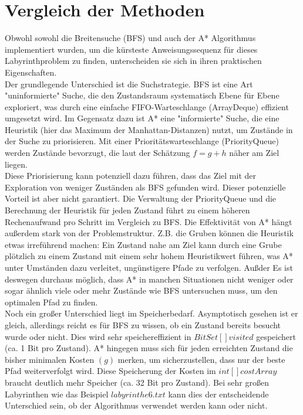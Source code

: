 \documentclass[a4paper,10pt,ngerman]{scrartcl}
\begin{document}
\section{Vergleich der Methoden}
Obwohl sowohl die Breitensuche (BFS) und auch der A* Algorithmus implementiert wurden, um die kürsteste Anweisungssequenz für dieses Labyrinthproblem zu finden, unterscheiden sie sich in ihren praktischen Eigenschaften.\\
Der grundlegende Unterschied ist die Suchstrategie. BFS ist eine Art "uninformierte" Suche, die den Zustandsraum systematisch Ebene für Ebene exploriert, was durch eine einfache FIFO-Warteschlange (ArrayDeque) effizient umgesetzt wird. Im Gegensatz dazu ist A* eine "informierte" Suche, die eine Heuristik (hier das Maximum der Manhattan-Distanzen) nutzt, um Zustände in der Suche zu priorisieren. Mit einer Prioritätswarteschlange (PriorityQueue) werden Zustände bevorzugt, die laut der Schätzung $f = g + h$ näher am Ziel liegen. \\
Diese Priorisierung kann potenziell dazu führen, dass das Ziel mit der Exploration von weniger Zuständen als BFS gefunden wird. Dieser potenzielle Vorteil ist aber nicht garantiert. Die Verwaltung der PriorityQueue und die Berechnung der Heuristik für jeden Zustand führt zu einem höheren Rechenaufwand pro Schritt im Vergleich zu BFS. Die Effektivität von A* hängt außerdem stark von der Problemstruktur. Z.B. die Gruben können die Heuristik etwas irreführend machen: Ein Zustand nahe am Ziel kann durch eine Grube plötzlich zu einem Zustand mit einem sehr hohem Heuristikwert führen, was A* unter Umständen dazu verleitet, ungünstigere Pfade zu verfolgen. Außder Es ist deswegen durchaus möglich, dass A* in manchen Situationen nicht weniger oder sogar ähnlich viele oder mehr Zustände wie BFS untersuchen muss, um den optimalen Pfad zu finden.\\
Noch ein großer Unterschied liegt im Speicherbedarf. Asymptotisch gesehen ist er gleich, allerdings reicht es für BFS zu wissen, ob ein Zustand bereits besucht wurde oder nicht. Dies wird sehr speichereffizient in $BitSet[] visited$ gespeichert (ca. 1 Bit pro Zustand). A* hingegen muss sich für jeden erreichten Zustand die bisher minimalen Kosten $(g)$ merken, um sicherzustellen, dass nur der beste Pfad weiterverfolgt wird. Diese Speicherung der Kosten im $int[] costArray$ braucht deutlich mehr Speicher (ca. 32 Bit pro Zustand). Bei sehr großen Labyrinthen wie das Beispiel $labyrinthe6.txt$ kann dies der entscheidende Unterschied sein, ob der Algorithmus verwendet werden kann oder nicht.\\
\end{document}
